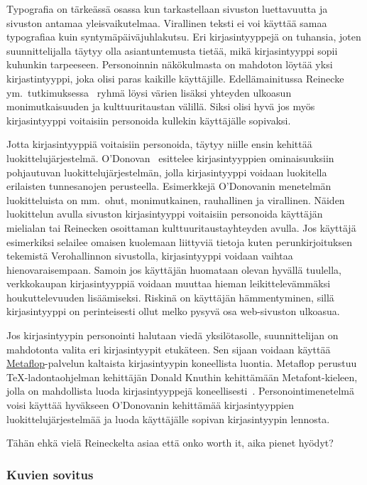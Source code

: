 \documentclass[finnish, 12pt, a4paper, elec, utf8, a-1b, online]{aaltothesis}
\begin{document}
Typografia on tärkeässä osassa kun tarkastellaan sivuston luettavuutta ja
sivuston antamaa yleisvaikutelmaa. Virallinen teksti ei voi käyttää samaa
typografiaa kuin syntymäpäiväjuhlakutsu. Eri kirjasintyyppejä on tuhansia, joten
suunnittelijalla täytyy olla asiantuntemusta tietää, mikä kirjasintyyppi sopii
kuhunkin tarpeeseen. Personoinnin näkökulmasta on mahdoton löytää yksi
kirjastintyyppi, joka olisi paras kaikille käyttäjille. Edellämainitussa
Reinecke ym.~tutkimuksessa~\cite{10.1145/2556288.2557052} ryhmä löysi värien
lisäksi yhteyden ulkoasun monimutkaisuuden ja kulttuuritaustan välillä. Siksi
olisi hyvä jos myös kirjasintyyppi voitaisiin personoida kullekin käyttäjälle
sopivaksi.

Jotta kirjasintyyppiä voitaisiin personoida, täytyy niille ensin kehittää
luokittelujärjestelmä. O'Donovan~\cite{odonovan_2015} esittelee kirjasintyyppien
ominaisuuksiin pohjautuvan luokittelujärjestelmän, jolla kirjasintyyppi voidaan
luokitella erilaisten tunnesanojen perusteella. Esimerkkejä O'Donovanin
menetelmän luokitteluista on mm.~ohut, monimutkainen, rauhallinen ja virallinen.
Näiden luokittelun avulla sivuston kirjasintyyppi voitaisiin personoida
käyttäjän mielialan tai Reinecken osoittaman kulttuuritaustayhteyden avulla. Jos
käyttäjä esimerkiksi selailee omaisen kuolemaan liittyviä tietoja kuten
perunkirjoituksen tekemistä Verohallinnon sivustolla, kirjasintyyppi voidaan
vaihtaa hienovaraisempaan. Samoin jos käyttäjän huomataan olevan hyvällä
tuulella, verkkokaupan kirjasintyyppiä voidaan muuttaa hieman leikittelevämmäksi
houkuttelevuuden lisäämiseksi. Riskinä on käyttäjän hämmentyminen, sillä
kirjasintyyppi on perinteisesti ollut melko pysyvä osa web-sivuston ulkoasua.

Jos kirjasintyypin personointi halutaan viedä yksilötasolle, suunnittelijan on
mahdotonta valita eri kirjasintyypit etukäteen. Sen sijaan voidaan käyttää
\href{https://www.metaflop.com/}{Metaflop}-palvelun kaltaista kirjasintyypin
koneellista luontia. Metaflop perustuu TeX-ladontaohjelman kehittäjän Donald
Knuthin kehittämään Metafont-kieleen, jolla on mahdollista luoda
kirjasintyyppejä koneellisesti~\cite{knuth_1986}. Personointimenetelmä voisi
käyttää hyväkseen O'Donovanin kehittämää kirjasintyyppien luokittelujärjestelmää
ja luoda käyttäjälle sopivan kirjasintyypin lennosta.

Tähän ehkä vielä Reineckelta asiaa että onko worth it, aika pienet hyödyt?

\subsubsection{Kuvien sovitus}
\end{document}
